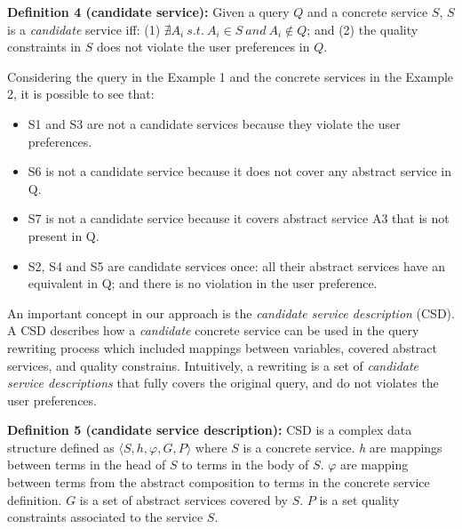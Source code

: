 \documentclass[12pt,a4paper,oneside]{article}
\begin{document}
\noindent \textbf{Definition 4 (candidate service):} Given a query $Q$ and a concrete service $S$, $S$ is a \textit{candidate} service iff: (1) $\nexists A_{i} \ s.t. \ A_{i} \in S \ and \ A_{i} \not\in Q$; and (2) the quality constraints in $S$ does not violate the user preferences in $Q$. 

Considering the query in the Example 1 and the concrete services in the Example 2, it is possible to see that:
\begin{itemize}
\item S1 and S3 are not a candidate services because they violate the user preferences.
\item S6 is not a candidate service because it does not cover any abstract service in Q.
\item S7 is not a candidate service because it covers abstract service A3 that is not present in Q.
\item S2, S4 and S5 are candidate services once: all their abstract services have an equivalent in Q; and there is no violation in the user preference.
\end{itemize}



An important concept in our approach is the \textit{candidate service description} (CSD). 
A CSD describes how a \textit{candidate} concrete service can be used in the query rewriting process which included mappings between variables, covered abstract services, and quality constrains.
Intuitively, a rewriting is a set of \textit{candidate service descriptions} that fully covers the original query, and do not violates the user preferences.

\noindent \textbf{Definition 5 (candidate service description):} CSD is a complex data structure defined as %
$\langle S, h, \varphi, G, P\rangle$
where $S$ is a concrete service. 
\textit{h} are mappings between terms in the head of $S$ to terms in the body of $S$. 
$\varphi$ are mapping between terms from the abstract composition to terms in the concrete service definition.
$G$ is a set of abstract services covered by $S$. 
$P$ is a set quality constraints associated to the service $S$. 
\end{document}
